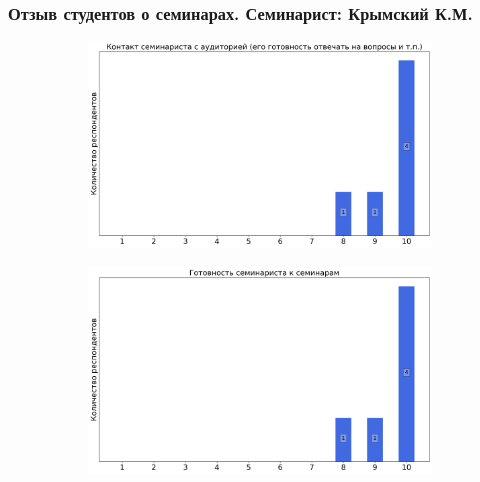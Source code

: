 	\subsubsection{Отзыв студентов о семинарах. Семинарист: Крымский К.М.}
		\begin{figure}[H]
			\centering
			\begin{subfigure}[b]{0.45\textwidth}
				\centering
				\includegraphics[width=\textwidth]{images/2 course/Общая физика - электричество и магнетизм/seminarists-marks-Крымский К.М.-0.png}
			\end{subfigure}
			\begin{subfigure}[b]{0.45\textwidth}
				\centering
				\includegraphics[width=\textwidth]{images/2 course/Общая физика - электричество и магнетизм/seminarists-marks-Крымский К.М.-1.png}
			\end{subfigure}
			\begin{subfigure}[b]{0.45\textwidth}
				\centering

\end{subfigure}
\end{figure}
